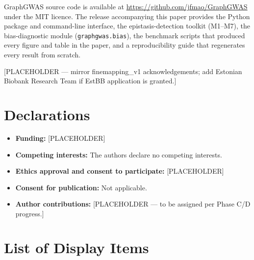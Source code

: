 \documentclass[pdflatex,sn-nature]{sn-jnl}
\begin{document}

GraphGWAS source code is available at
\url{https://github.com/jfmao/GraphGWAS} under the MIT licence. The
release accompanying this paper provides the Python package and
command-line interface, the epistasis-detection toolkit (M1--M7),
the bias-diagnostic module (\texttt{graphgwas.bias}), the benchmark
scripts that produced every figure and table in the paper, and a
reproducibility guide that regenerates every result from scratch.


[PLACEHOLDER --- mirror finemapping\_v1 acknowledgements; add Estonian
Biobank Research Team if EstBB application is granted.]

\section*{Declarations}

\begin{itemize}
\item \textbf{Funding:} [PLACEHOLDER]
\item \textbf{Competing interests:} The authors declare no competing interests.
\item \textbf{Ethics approval and consent to participate:} [PLACEHOLDER]
\item \textbf{Consent for publication:} Not applicable.
\item \textbf{Author contributions:} [PLACEHOLDER --- to be assigned per Phase C/D progress.]
\end{itemize}



\clearpage

\section*{List of Display Items}
\end{document}
